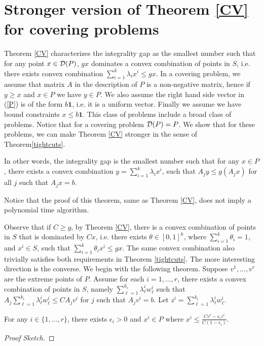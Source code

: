 
\section{Stronger version of Theorem \ref{CV} for covering problems} \label{gap}

Theorem \ref{CV} characterizes the integrality gap as the smallest number such that for any point $x\in \operatorname{\mathcal{D}}(P)$, $gx$ dominates a convex combination of points in $S$, i.e. there exists convex combination $\sum_{i=1}^{k}\lambda_ix^i \leq gx$.  In a covering problem, we assume that matrix $A$ in the description of $P$ is a non-negative matrix, hence if $y\geq x$ and $x\in P$ we have $y\in P$. We also assume the right hand side vector in (\ref{P}) is of the form $b\textbf{1}$, i.e. it is a uniform vector. Finally we assume we have bound constraints $x\leq b\textbf{1}$. This class of problems include a broad class of problems. Notice that for a covering problem $\operatorname{\mathcal{D}}(P)=P$.  We show that for these problems, we can make Theorem \ref{CV} stronger in the sense of Theorem\ref{tightcuts}.

In other words, the integrality gap is the smallest number such that for any $x\in P$, there exists a convex combination $y=\sum_{i=1}^{k}\lambda_ix^i$, such that $A_jy\leq g(A_jx)$ for all $j$ such that $A_jx=b$. 

Notice that the proof of this theorem, same as Theorem \ref{CV}, does not imply a polynomial time algorithm.

Observe that if $C\geq g$, by Theorem \ref{CV}, there is a convex combination of points in $S$ that is dominated by $Cx$, i.e. there exists $\theta\in [0,1]^{k}$, where $\sum_{i=1}^{k}\theta_i=1$, and $x^i\in S$, such that $\sum_{i=1}^{k}\theta_ix^i\leq gx$. The same convex combination also trivially satisfies both requirements in Theorem \ref{tightcuts}. The more interesting direction is the converse. We begin with the following theorem. Suppose $v^1,\ldots,v^r$ are the extreme points of $P$. Assume for each $i=1,\ldots,r$, there exists a convex combination of points in $S$, namely $\sum_{\ell=1}^{k_i} \lambda^i_\ell w^i_\ell$ such that $A_j \sum_{\ell=1}^{k_i} \lambda^i_\ell w^i_\ell \leq CA_jv^i$ for $j$ such that $A_jv^i = b$. Let $z^i = \sum_{\ell=1}^{k_i} \lambda^i_\ell w^i_\ell$.
\begin{lemma}\label{epsilon}
	For any  $i\in\{1,\ldots,r\}$, there exists $\epsilon_i >0$ and ${x^i}\in P$ where ${x^i}\leq \frac{Cv^i-\epsilon_i z^i}{C(1-\epsilon_i)}$.
\end{lemma}
\begin{proof}[Proof Sketch]
	
	\end{proof}

